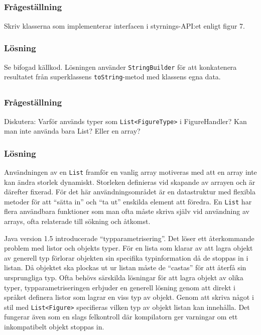 \subsection{}\label{sec:uppg3b}
\subsubsection*{Frågeställning}
Skriv klasserna som implementerar interfacen i styrnings-API:et enligt figur 7.

\subsubsection*{Lösning}
Se bifogad källkod. Lösningen använder \texttt{StringBuilder} för att
konkatenera resultatet från superklassens \texttt{toString}-metod med klassens
egna data.


\subsection{}\label{sec:uppg3c}
\subsubsection*{Frågeställning}
Diskutera: Varför används typer som \texttt{List<FigureType>} i FigureHandler?
Kan man inte använda bara List? Eller en array?


\subsubsection*{Lösning}
Användningen av en \texttt{List} framför en vanlig array motiveras med att en
array inte kan ändra storlek dynamiskt. Storleken definieras vid skapande av
arrayen och är därefter fixerad. För det här användningsområdet är en
datastruktur med flexibla metoder för att ``sätta in'' och ``ta ut'' enskilda
element att föredra. En \texttt{List} har flera användbara funktioner som man
ofta måste skriva själv vid användning av arrays, ofta relaterade till sökning
och åtkomst.

Java version 1.5 introducerade ``typparametrisering''.
Det löser ett återkommande problem med listor och objekts typer. För en lista
som klarar av att lagra objekt av generell typ förlorar objekten sin specifika
typinformation då de stoppas in i listan. Då objektet ska plockas ut ur listan
måste de ``castas'' för att återfå sin ursprungliga typ. Ofta behövs särskilda
lösningar för att lagra objekt av olika typer, typparametriseringen erbjuder en
generell lösning genom att direkt i språket definera listor som lagrar en viss
typ av objekt.
Genom att skriva något i stil med \texttt{List<Figure>} specifieras vilken typ
av objekt listan kan innehålla.  Det fungerar även som en slags felkontroll där
kompilatorn ger varningar om ett inkompatibelt objekt stoppas in.


\caption{Java SE Tutorials -- Learning the Java Language > Generics
\footnote{\url{https://docs.oracle.com/javase/tutorial/java/generics/why.html}}
}
\label{src:generics}


